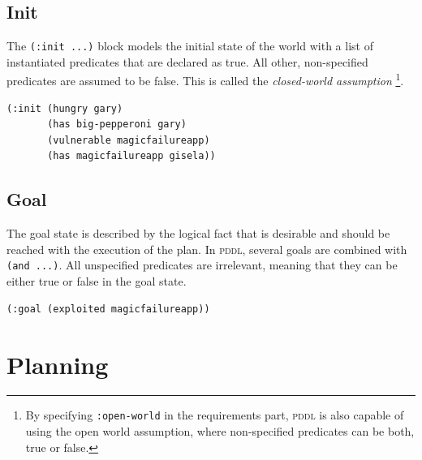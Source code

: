 \documentclass[a4paper,12pt]{report}
\begin{document}
\subsection{Init}
\label{sec-2-3-4}

The \texttt{(:init ...)} block models the initial state of the world with a
list of instantiated predicates that are declared as true. All other,
non-specified predicates are assumed to be false. This is called the
\emph{closed-world assumption} \footnote{By specifying \texttt{:open-world} in the requirements part, \textsc{pddl} is
also capable of using the open world assumption, where non-specified
predicates can be both, true or false.}.

\begin{listing}[H]
\begin{verbatim}
(:init (hungry gary)
       (has big-pepperoni gary)
       (vulnerable magicfailureapp)
       (has magicfailureapp gisela))
\end{verbatim}
\caption{The initial situation in Gary's Huge Problem consists of the hungry hacker Gary and the vulnerable application MagicFailureApp that belongs to Gisela.}
\end{listing}

\subsection{Goal}
\label{sec-2-3-5}

The goal state is described by the logical fact that is desirable and
should be reached with the execution of the plan. In \textsc{pddl},
several goals are combined with \texttt{(and ...)}. All unspecified predicates
are irrelevant, meaning that they can be either true or false in the
goal state.

\begin{listing}[H]
\begin{verbatim}
(:goal (exploited magicfailureapp))
\end{verbatim}
\caption{In the end, the software magicfailureapp should be exploited.}
\end{listing}

\section{Planning}
\label{sec-2-4}
\end{document}
